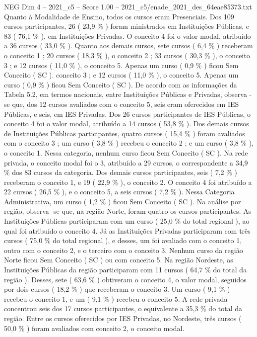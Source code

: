 \begin{textsample}{NEG Dim 4 – 2021\_c5 – Score 1.00 – 2021\_c5/enade\_2021\_des\_64eae85373.txt}
Quanto à Modalidade de Ensino, todos os cursos eram Presenciais.
Dos 109 cursos participantes, 26 ( 23,9 \% ) foram ministrados em Instituições Públicas, e 83 ( 76,1 \% ), em Instituições Privadas.
O conceito 4 foi o valor modal, atribuído a 36 cursos ( 33,0 \% ).
Quanto aos demais cursos, sete cursos ( 6,4 \% ) receberam o conceito 1 ; 20 cursos ( 18,3 \% ), o conceito 2 ; 33 cursos ( 30,3 \% ), o conceito 3 ; e 12 cursos ( 11,0 \% ), o conceito 5.
Apenas um curso ( 0,9 \% ) ficou Sem Conceito ( SC ). conceito 3 ; e 12 cursos ( 11,0 \% ), o conceito 5.
Apenas um curso ( 0,9 \% ) ficou Sem Conceito ( SC ).
De acordo com as informações da Tabela 5.2, em termos nacionais, entre Instituições Públicas e Privadas, observa -se que, dos 12 cursos avaliados com o conceito 5, seis eram oferecidos em IES Públicas, e seis, em IES Privadas.
Dos 26 cursos participantes de IES Públicas, o conceito 4 foi o valor modal, atribuído a 14 cursos ( 53,8 \% ).
Dos demais cursos de Instituições Públicas participantes, quatro cursos ( 15,4 \% ) foram avaliados com o conceito 3 ; um curso ( 3,8 \% ) recebeu o conceito 2 ; e um curso ( 3,8 \% ), o conceito 1.
Nessa categoria, nenhum curso ficou Sem Conceito ( SC ).
Na rede privada, o conceito modal foi o 3, atribuído a 29 cursos, o correspondente a 34,9 \% dos 83 cursos da categoria.
Dos demais cursos participantes, seis ( 7,2 \% ) receberam o conceito 1, e 19 ( 22,9 \% ), o conceito 2.
O conceito 4 foi atribuído a 22 cursos ( 26,5 \% ), e o conceito 5, a seis cursos ( 7,2 \% ).
Nessa Categoria Administrativa, um curso ( 1,2 \% ) ficou Sem Conceito ( SC ).
Na análise por região, observa -se que, na região Norte, foram quatro os cursos participantes.
As Instituições Públicas participaram com um curso ( 25,0 \% do total regional ), ao qual foi atribuído o conceito 4.
Já as Instituições Privadas participaram com três cursos ( 75,0 \% do total regional ), e desses, um foi avaliado com o conceito 1, outro com o conceito 2, e o terceiro com o conceito 3.
Nenhum curso da região Norte ficou Sem Conceito ( SC ) ou com conceito 5.
Na região Nordeste, as Instituições Públicas da região participaram com 11 cursos ( 64,7 \% do total da região ).
Desses, sete ( 63,6 \% ) obtiveram o conceito 4, o valor modal, seguidos por dois cursos ( 18,2 \% ) que receberam o conceito 3.
Um curso ( 9,1 \% ) recebeu o conceito 1, e um ( 9,1 \% ) recebeu o conceito 5.
A rede privada concentrou seis dos 17 cursos participantes, o equivalente a 35,3 \% do total da região.
Entre os cursos oferecidos por IES Privadas, no Nordeste, três cursos ( 50,0 \% ) foram avaliados com conceito 2, o conceito modal.

\end{textsample}
